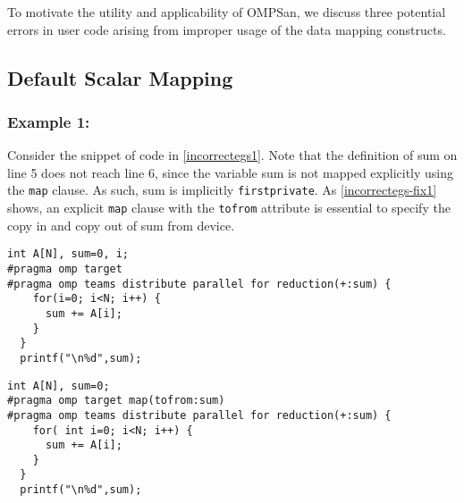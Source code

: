 To motivate the utility and applicability of OMPSan,
we discuss three potential errors in user code arising from 
improper usage of the data mapping constructs.

\vspace{-5pt} 
\subsection{Default Scalar Mapping}
\subsubsection{Example 1:}
Consider the snippet of code in \autoref{incorrectegs1}.
Note that the definition of \textsf{sum} on line 5 does not reach line 6,
since the variable \textsf{sum} is not mapped explicitly using the \texttt{map} 
clause. As such, \textsf{sum}  is implicitly \texttt{firstprivate}. 
As \autoref{incorrectegs-fix1} shows, an explicit \texttt{map} clause with the
\texttt{tofrom} attribute is essential to specify the copy in and copy out of
 \textsf{sum} from device.

\begin{minipage}{.4\textwidth}
\begin{lstlisting}[style=customc, frame=tlrb, caption={Default scalar map}, label=incorrectegs1]
int A[N], sum=0, i;
#pragma omp target
#pragma omp teams distribute parallel for reduction(+:sum) {
    for(i=0; i<N; i++) {
      sum += A[i];
    }
  }  
  printf("\n%d",sum);
\end{lstlisting}
\end{minipage}\hfil
\begin{minipage}{.4\textwidth}
\begin{lstlisting}[style=customc, frame=tlrb, caption={Explicit map}, label=incorrectegs-fix1]
int A[N], sum=0;
#pragma omp target map(tofrom:sum)
#pragma omp teams distribute parallel for reduction(+:sum) {
    for( int i=0; i<N; i++) {
      sum += A[i];
    }
  }
  printf("\n%d",sum);
\end{lstlisting}
\end{minipage}
\vspace{-5pt}
